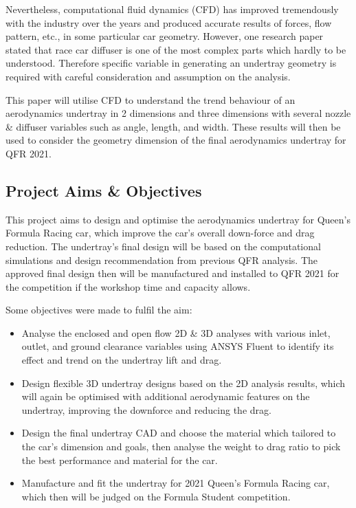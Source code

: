 \noindent Nevertheless, computational fluid dynamics (CFD) has improved tremendously with the industry over the years and produced accurate results of forces, flow pattern, etc., in some particular car geometry. However, one research paper \cite{Zhang2006GroundCars} stated that race car diffuser is one of the most complex parts which hardly to be understood. Therefore specific variable in generating an undertray geometry is required with careful consideration and assumption on the analysis. 

\noindent This paper will utilise CFD to understand the trend behaviour of an aerodynamics undertray in 2 dimensions and three dimensions with several nozzle \& diffuser variables such as angle, length, and width. These results will then be used to consider the geometry dimension of the final aerodynamics undertray for QFR 2021.

\subsection{Project Aims \& Objectives}
This project aims to design and optimise the aerodynamics undertray for Queen's Formula Racing car, which improve the car's overall down-force and drag reduction. The undertray's final design will be based on the computational simulations and design recommendation from previous QFR analysis. The approved final design then will be manufactured and installed to QFR 2021 for the competition if the workshop time and capacity allows.

\noindent
Some objectives were made to fulfil the aim:
\begin{itemize}

    \item Analyse the enclosed and open flow 2D \& 3D analyses with various inlet, outlet, and ground clearance variables using ANSYS Fluent to identify its effect and trend on the undertray lift and drag. 
    
    \item Design flexible 3D undertray designs based on the 2D analysis results, which will again be optimised with additional aerodynamic features on the undertray, improving the downforce and reducing the drag.
    
	\item Design the final undertray CAD and choose the material which tailored to the car’s dimension and goals, then analyse the weight to drag ratio to pick the best performance and material for the car.
	
    \item Manufacture and fit the undertray for 2021 Queen’s Formula Racing car, which then will be judged on the Formula Student competition.
\end{itemize}